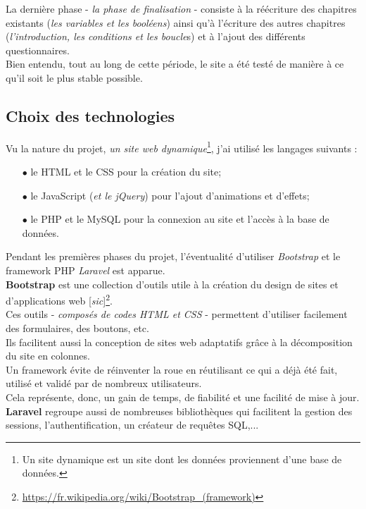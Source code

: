 La dernière phase - \textit{la phase de finalisation} - consiste à la réécriture des chapitres existants (\textit{les variables et les booléens}) ainsi qu'à l'écriture des autres chapitres (\textit{l'introduction, les conditions et les boucle}s) et à l'ajout des différents questionnaires. \\
Bien entendu, tout au long de cette période, le site a été testé de manière à ce qu'il soit le plus stable possible.

\newpage


\subsection{Choix des technologies}
\label{subsec:choix-des-technologies}

Vu la nature du projet, \textit{un site web dynamique}\footnote{Un site dynamique est un site dont les données proviennent d’une base de données.}, j'ai utilisé les langages suivants :
\begin{itemize}

    \item[$\bullet$] le HTML et le CSS pour la création du site;
    \item[$\bullet$] le JavaScript (\textit{et le jQuery}) pour l'ajout d'animations et d'effets;
    \item[$\bullet$] le PHP et le MySQL pour la connexion au site et l'accès à la base de données. \\

\end{itemize}

Pendant les premières phases du projet, l'éventualité d'utiliser \textit{Bootstrap} et le framework PHP \textit{Laravel} est apparue. \\

\textbf{Bootstrap} est une collection d'outils utile à la création du design de sites et d'applications web [\textit{sic}]\footnote{\url{https://fr.wikipedia.org/wiki/Bootstrap_(framework)}}. \\
Ces outils - \textit{composés de codes HTML et CSS} - permettent d'utiliser facilement des formulaires, des boutons, etc. \\
Ils facilitent aussi la conception de sites web adaptatifs grâce à la décomposition du site en colonnes. \\

Un framework évite de réinventer la roue en réutilisant ce qui a déjà été fait, utilisé et validé par de nombreux utilisateurs. \\
Cela représente, donc, un gain de temps, de fiabilité et une facilité de mise à jour. \\
\textbf{Laravel} regroupe aussi de nombreuses bibliothèques qui facilitent la gestion des sessions, l’authentification, un créateur de requêtes SQL,... \\

